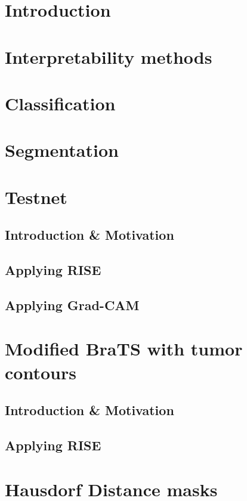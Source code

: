 \chapter{Introduction}


\chapter{Interpretability methods}


\chapter{Classification}


\chapter{Segmentation}


\chapter{Testnet}
\section{Introduction \& Motivation}
\section{Applying RISE}
\section{Applying Grad-CAM}

\chapter{Modified BraTS with tumor contours}
\section{Introduction \& Motivation}
\section{Applying RISE}

\chapter{Hausdorf Distance masks}

